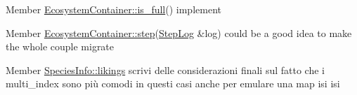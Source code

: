 \label{todo__todo000001}
\hypertarget{todo__todo000001}{}
 
\begin{DoxyDescription}
\item[Member \hyperlink{classEcosystemContainer_ac2c4ace58f9adbb265f61057420c5565}{EcosystemContainer::is\_\-full}() ]implement 
\end{DoxyDescription}

\label{todo__todo000003}
\hypertarget{todo__todo000003}{}
 
\begin{DoxyDescription}
\item[Member \hyperlink{classEcosystemContainer_a236c01266343664efab29b1a73e72d1d}{EcosystemContainer::step}(\hyperlink{structStepLog}{StepLog} \&log) ]could be a good idea to make the whole couple migrate 
\end{DoxyDescription}

\label{todo__todo000002}
\hypertarget{todo__todo000002}{}
 
\begin{DoxyDescription}
\item[Member \hyperlink{structSpeciesInfo_a109b3e5acaf126bb8df9648b6c925542}{SpeciesInfo::likings} ]scrivi delle considerazioni finali sul fatto che i multi\_\-index sono più comodi in questi casi anche per emulare una map isi isi 
\end{DoxyDescription}